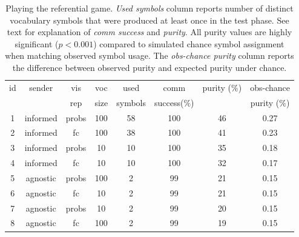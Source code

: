 \begin{table}
\centering
\begin{tabular}{c|c|c|c|c|c|c|c}
id & sender   &vis   &voc &used     &comm    &      purity ($\%$)   &obs-chance\\
 	&	& rep & size& symbols & success($\%$) &  & purity ($\%$) \\\hline
1&informed&probs     &100       &58          &100                &46           &0.27 \\
2&informed&fc        &100       &38          &100                &41           &0.23 \\
3&informed&probs     &10        &10          &100                &35           &0.18 \\
4&informed&fc        &10        &10          &100                &32           &0.17 \\
5&agnostic&probs     &100       &2           &99                 &21           &0.15 \\
6&agnostic&fc        &10        &2           &99                 &21           &0.15 \\
7&agnostic&probs     &10        &2           &99                 &20           &0.15 \\
8&agnostic&fc        &100       &2           &99                 &19           &0.15 \\
\end{tabular}
\label{tab:exp1_table}
\caption{Playing the referential game. \emph{Used symbols} column reports number of distinct vocabulary symbols that were produced at least once in the test phase. See text for explanation of \emph{comm success} and \emph{purity}. All purity values are highly significant ($p<0.001$) compared to simulated chance symbol assignment when matching observed symbol usage. %
The \emph{obs-chance purity} column reports the difference between observed purity and expected purity under chance.}
\end{table}

